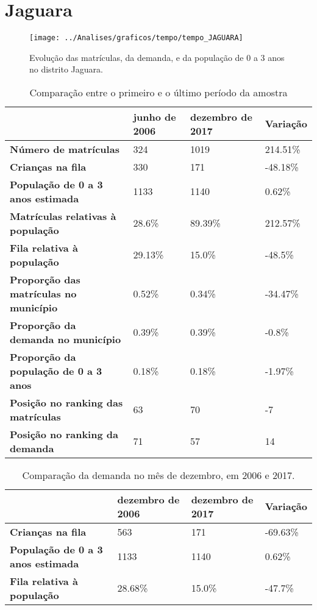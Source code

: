 \section{Jaguara}
\begin{figure}[H]
\centering
\texttt{[image: ../Analises/graficos/tempo/tempo\_JAGUARA]}
\caption{Evolução das matrículas, da demanda, e da população de 0 a 3 anos no distrito Jaguara.}
\end{figure}
\begin{table}[H]
\begin{tabular}{|l|l|l|l|}
\hline
\textbf{}                                      & \textbf{junho de 2006}       & \textbf{dezembro de 2017}    & \textbf{Variação} \\ \hline
\textbf{Número de matrículas}                  & 324 & 1019 & 214.51\% \\ \hline
\textbf{Crianças na fila}                      & 330 & 171 & -48.18\% \\ \hline
\textbf{População de 0 a 3 anos estimada}      & 1133 & 1140 & 0.62\% \\ \hline
\textbf{Matrículas relativas à população}      & 28.6\% & 89.39\% & 212.57\% \\ \hline
\textbf{Fila relativa à população}             & 29.13\% & 15.0\% & -48.5\% \\ \hline
\textbf{Proporção das matrículas no município} & 0.52\% & 0.34\% & -34.47\% \\ \hline
\textbf{Proporção da demanda no município}     & 0.39\% & 0.39\% & -0.8\% \\ \hline
\textbf{Proporção da população de 0 a 3 anos}  & 0.18\% & 0.18\% & -1.97\% \\ \hline
\textbf{Posição no ranking das matrículas}     & 63 & 70 & -7 \\ \hline
\textbf{Posição no ranking da demanda}         & 71 & 57 & 14 \\ \hline
\end{tabular}
\caption{Comparação entre o primeiro e o último período da amostra}
\end{table}
\begin{table}[H]
\begin{tabular}{|l|l|l|l|}
\hline
\textbf{}                                 & \textbf{dezembro de 2006} & \textbf{dezembro de 2017} & \textbf{Variação} \\ \hline
\textbf{Crianças na fila}                      & 563 & 171 & -69.63\% \\ \hline
\textbf{População de 0 a 3 anos estimada}      & 1133 & 1140 & 0.62\% \\ \hline
\textbf{Fila relativa à população}             & 28.68\% & 15.0\% & -47.7\% \\ \hline
\end{tabular}
\caption{Comparação da demanda no mês de dezembro, em 2006 e 2017.}
\end{table}
